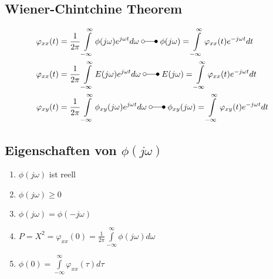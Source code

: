 \subsection{Wiener-Chintchine Theorem}
	\begin{align}
		\varphi_{xx}(t) &= \frac{1}{2\pi}\int\limits_{-\infty}^{\infty}\phi(j\omega)e^{j\omega t}d\omega \; \laplace \;
			\phi(j\omega) = \int\limits_{-\infty}^{\infty}\varphi_{xx}(t)e^{-j\omega t} dt \nonumber \\
		\varphi_{xx}(t) &= \frac{1}{2\pi}\int\limits_{-\infty}^{\infty}E(j\omega)e^{j\omega t}d\omega \; \laplace \;
			E(j\omega) = \int\limits_{-\infty}^{\infty}\varphi_{xx}(t)e^{-j\omega t} dt \nonumber \\
		\varphi_{xy}(t) &= \frac{1}{2\pi}\int\limits_{-\infty}^{\infty}\phi_{xy}(j\omega)e^{j\omega t}d\omega \; \laplace \;
			\phi_{xy}(j\omega) = \int\limits_{-\infty}^{\infty}\varphi_{xy}(t)e^{-j\omega t} dt \nonumber
	\end{align}
	
\subsection{Eigenschaften von $\phi(j\omega)$}
	\begin{enumerate}
		\item	$\phi(j\omega)$ ist reell
		\item $\phi(j\omega) \geq 0$
		\item $\phi(j\omega) = \phi(-j\omega)$
		\item $P = X^2 = \varphi_{xx}(0) = \frac{1}{2\pi} \int\limits_{-\infty}^{\infty} \phi(j\omega) d\omega$
		\item $\phi(0) = \int\limits_{-\infty}^{\infty} \varphi_{xx}(\tau)d\tau$
	\end{enumerate}
